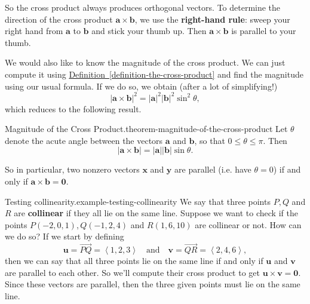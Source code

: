 \documentclass[10pt,]{book}
\newcommand{\terminology}[1]{\textbf{#1}}
\numberwithin{equation}{section}
\newcommand{\vv}[1]{\mathbf{#1}}
\newcommand{\dotprod}[1]{\left\langle #1 \right\rangle}
\begin{document}
\hypertarget{p-1174}{}%
So the cross product always produces orthogonal vectors. To determine the direction of the cross product \(\vv{a}\times\vv{b}\), we use the \terminology{right-hand rule}: sweep your right hand from \(\vv{a}\) to \(\vv{b}\) and stick your thumb up. Then \(\vv{a}\times\vv{b}\) is parallel to your thumb.%
\par
\hypertarget{p-1175}{}%
We would also like to know the magnitude of the cross product. We can just compute it using \hyperref[definition-the-cross-product]{Definition~\ref{definition-the-cross-product}} and find the magnitude using our usual formula. If we do so, we obtain (after a lot of simplifying!)%
%
\begin{equation*}
|\vv{a}\times\vv{b}|^{2} = |\vv{a}|^{2}|\vv{b}|^{2}\sin^{2}\theta,
\end{equation*}
\hypertarget{p-1176}{}%
which reduces to the following result.%
\begin{theorem}{Magnitude of the Cross Product.}{}{theorem-magnitude-of-the-cross-product}%
\hypertarget{p-1177}{}%
Let \(\theta\) denote the acute angle between the vectors \(\vv{a}\) and \(\vv{b}\), so that \(0\leq\theta\leq\pi\). Then%
%
\begin{equation*}
|\vv{a}\times\vv{b}| = |\vv{a}||\vv{b}|\sin\theta.
\end{equation*}
\end{theorem}
\hypertarget{p-1178}{}%
So in particular, two nonzero vectors \(\vv{x}\) and \(\vv{y}\) are parallel (i.e. have \(\theta=0\)) if and only if \(\vv{a}\times\vv{b} = \vv{0}\).%
\begin{example}{Testing collinearity.}{example-testing-collinearity}%
\hypertarget{p-1179}{}%
We say that three points \(P,Q\) and \(R\) are \terminology{collinear} if they all lie on the same line. Suppose we want to check if the points \(P(-2,0,1), Q(-1,2,4)\) and \(R(1,6,10)\) are collinear or not. How can we do so? If we start by defining%
%
\begin{equation*}
\vv{u} = \vec{PQ} = \dotprod{1,2,3}\quad\text{and}\quad \vv{v} = \vec{QR} = \dotprod{2,4,6},
\end{equation*}
\hypertarget{p-1180}{}%
then we can say that all three points lie on the same line if and only if \(\vv{u}\) and \(\vv{v}\) are parallel to each other. So we'll compute their cross product to get \(\vv{u}\times\vv{v} = \vv{0}\). Since these vectors are parallel, then the three given points must lie on the same line.%
\end{example}
\hypertarget{p-1181}{}%
\end{document}
